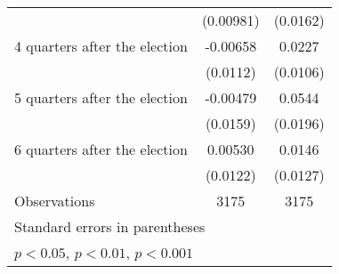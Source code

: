 \begin{table}[htbp]
\begin{tabular}{l*{2}{c}}
                    &   (0.00981)         &    (0.0162)         \\
[1em]
 4 quarters after the election&    -0.00658         &      0.0227\sym{*}  \\
                    &    (0.0112)         &    (0.0106)         \\
[1em]
 5 quarters after the election&    -0.00479         &      0.0544\sym{**} \\
                    &    (0.0159)         &    (0.0196)         \\
[1em]
 6 quarters after the election&     0.00530         &      0.0146         \\
                    &    (0.0122)         &    (0.0127)         \\
\hline
Observations        &        3175         &        3175         \\
\hline\hline
\multicolumn{3}{l}{\footnotesize Standard errors in parentheses}\\
\multicolumn{3}{l}{\footnotesize \sym{*} \(p<0.05\), \sym{**} \(p<0.01\), \sym{***} \(p<0.001\)}\\
\end{tabular}
\end{table}
